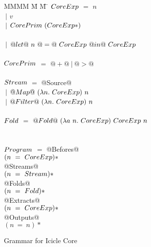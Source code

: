 
\begin{figure}

\begin{tabbing}
MMMM \= M \= M \= \kill
$\mit{CoreExp}$
    \> $=$  \> $n$          \\
    \> $~|$ \> $v$ \\
    \> $~|$ \> $\mit{CorePrim}~(\mit{CoreExp}*)$ \\
\\
    \> $~|$ \> $@let@~n~@=@~\mit{CoreExp}~@in@~\mit{CoreExp}$ \\
\\
$\mit{CorePrim}$
    \> $=$  \> $@+@~|~@>@$ \\
\\
$\mit{Stream}$
    \> $=$  \>  @Source@ \\
    \> $~|$ \> $@Map@~(\lambda{}n.~\mit{CoreExp})~n$ \\
    \> $~|$ \> $@Filter@~(\lambda{}n.~\mit{CoreExp})~n$ \\
\\
$\mit{Fold}$
    \> $=$  \> $@Fold@~(\lambda{}a~n.~\mit{CoreExp})~\mit{CoreExp}~n$ \\
\\
\\
$\mit{Program}$
    \> $=$  \> @Befores@ \\
    \>      \> \> $(n~=~\mit{CoreExp})*$ \\
    \>      \> @Streams@ \\
    \>      \> \> $(n~=~\mit{Stream})*$ \\
    \>      \> @Folds@ \\
    \>      \> \> $(n~=~\mit{Fold})*$ \\
    \>      \> @Extracts@ \\
    \>      \> \> $(n~=~\mit{CoreExp})*$ \\
    \>      \> @Outputs@ \\
    \>      \> \> $(n~=~n)*$ \\
\end{tabbing}


\caption{Grammar for Icicle Core}
\label{fig:core:grammar}
\end{figure}

